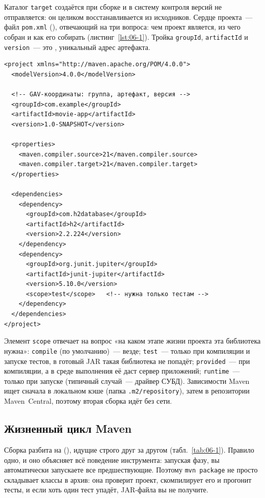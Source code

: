 Каталог \texttt{target} создаётся при сборке и в систему контроля версий не
отправляется: он целиком восстанавливается из исходников. Сердце проекта~---
файл \texttt{pom.xml} (), отвечающий на три вопроса:
чем проект является, из чего собран и как его собирать
(листинг~\ref{lst:06-1}). Тройка \texttt{groupId}, \texttt{artifactId} и
\texttt{version}~--- это , уникальный адрес артефакта.

\begin{listing}[H]
\begin{verbatim}
<project xmlns="http://maven.apache.org/POM/4.0.0">
  <modelVersion>4.0.0</modelVersion>

  <!-- GAV-координаты: группа, артефакт, версия -->
  <groupId>com.example</groupId>
  <artifactId>movie-app</artifactId>
  <version>1.0-SNAPSHOT</version>

  <properties>
    <maven.compiler.source>21</maven.compiler.source>
    <maven.compiler.target>21</maven.compiler.target>
  </properties>

  <dependencies>
    <dependency>
      <groupId>com.h2database</groupId>
      <artifactId>h2</artifactId>
      <version>2.2.224</version>
    </dependency>
    <dependency>
      <groupId>org.junit.jupiter</groupId>
      <artifactId>junit-jupiter</artifactId>
      <version>5.10.0</version>
      <scope>test</scope>   <!-- нужна только тестам -->
    </dependency>
  </dependencies>
</project>
\end{verbatim}
\caption{Файл pom.xml: координаты, свойства и зависимости}
\label{lst:06-1}
\end{listing}

Элемент \texttt{scope} отвечает на вопрос «на каком этапе жизни проекта эта
библиотека нужна»: \texttt{compile} (по умолчанию)~--- везде;
\texttt{test}~--- только при компиляции и запуске тестов, в готовый JAR такая
библиотека не попадёт; \texttt{provided}~--- при компиляции, а в среде
выполнения её даст сервер приложений; \texttt{runtime}~--- только при запуске
(типичный случай~--- драйвер СУБД). Зависимости Maven ищет сначала в локальном
кэше (папка \texttt{.m2/repository}), затем в репозитории Maven~Central,
поэтому вторая сборка идёт без сети.

\subsection{Жизненный цикл Maven}

Сборка разбита на  (), идущие строго друг за другом
(табл.~\ref{tab:06-1}). Правило одно, и оно объясняет всё поведение
инструмента: запуская фазу, вы автоматически запускаете все предшествующие.
Поэтому \texttt{mvn package} не просто складывает классы в архив: она проверит
проект, скомпилирует его и прогонит тесты, и если хоть один тест упадёт,
JAR-файла вы не получите.

